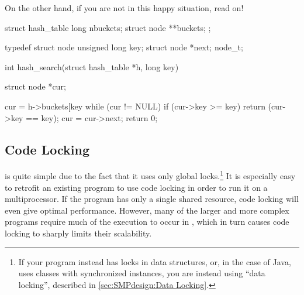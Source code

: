 \QuickQuizEnd

On the other hand, if you are not in this happy situation, read on!

\begin{listing}
\begin{VerbatimL}[commandchars=\\\@\$]
struct hash_table
{
	long nbuckets;
	struct node **buckets;
};

typedef struct node {
	unsigned long key;
	struct node *next;
} node_t;

int hash_search(struct hash_table *h, long key)
{
	struct node *cur;

	cur = h->buckets[key %
	while (cur != NULL) {
		if (cur->key >= key) {
			return (cur->key == key);
		}
		cur = cur->next;
	}
	return 0;
}
\end{VerbatimL}
\caption{Sequential-Program Hash Table Search}
\label{lst:SMPdesign:Sequential-Program Hash Table Search}
\end{listing}


\subsection{Code Locking}
\label{sec:SMPdesign:Code Locking}

 is quite simple due to the fact that it uses only
global locks.\footnote{
	If your program instead has locks in data structures,
	or, in the case of Java, uses classes with synchronized
	instances, you are instead using ``data locking'', described
	in \cref{sec:SMPdesign:Data Locking}.}
It is especially
easy to retrofit an existing program to use code locking in
order to run it on a multiprocessor.
If the program has only a single shared resource, code locking
will even give optimal performance.
However, many of the larger and more complex programs
require much of the execution to
occur in , which in turn causes code locking
to sharply limits their scalability.

